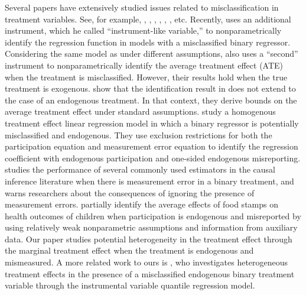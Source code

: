 \documentclass[11pt,reqno]{amsart}
\theoremstyle{plain}
\numberwithin{equation}{section}
\begin{document}
Several papers have extensively studied issues related to misclassification in treatment variables. See, for example, \cite{Aigner1973}, \cite{Bollinger1996}, \cite{Hausman_al1998}, \cite{Molinari2008}, \cite{Hu2008}, \cite{HuSchennach2008}, etc. Recently, \cite{Mahajan2006}  uses an additional instrument, which he called ``instrument-like variable,'' to nonparametrically identify the regression function in models with a misclassified binary regressor. Considering the same model as \cite{Mahajan2006} under different assumptions, \cite{Lewbel2007} also uses a ``second'' instrument to nonparametrically identify the average treatment effect (ATE) when the treatment is misclassified. However, their results hold when the true treatment is exogenous. \cite{DiTraglia2019} show that the identification result in \cite{Mahajan2006} does not extend to the case of an endogenous treatment. In that context, they derive bounds on the average treatment effect under standard assumptions. \cite{Nguimkeu_al2019} study a homogenous treatment effect linear regression model in which a  binary  regressor  is  potentially  misclassified  and  endogenous. They use exclusion restrictions for both the participation equation and measurement error equation to identify the regression coefficient with endogenous participation and one-sided endogenous misreporting. 
\cite{Millimet2011} studies the performance of several commonly used estimators in the causal inference literature when there is measurement error in a binary treatment, and warns researchers about the consequences of ignoring the presence of measurement errors.
\cite{Kreideral2012} partially identify the average effects of food stamps on health outcomes of children when participation is endogenous and misreported by using relatively weak nonparametric assumptions and information from auxiliary data. Our paper studies potential heterogeneity in the treatment effect through the marginal treatment effect when the treatment is endogenous and mismeasured. A more related work to ours is \cite{Ura2020}, who investigates heterogeneous treatment effects in the presence of a misclassified endogenous binary treatment variable through the instrumental variable quantile regression model. 
\end{document}
